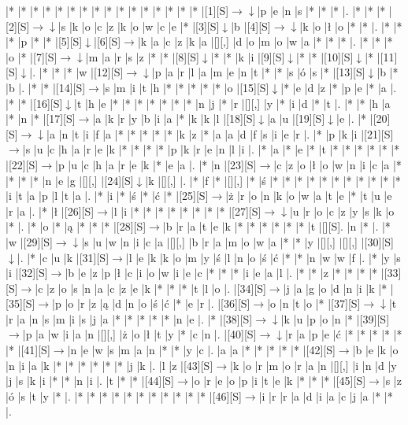 \documentclass[11pt]{article}
\newcommand\drarr{$\rightarrow \!\!\!\!\! \downarrow$}
\newcommand\rarr{$\rightarrow$}
\newcommand\darr{$\downarrow$}
\begin{document}
\noindent\begin{Puzzle}{23}{27}|*	|*	|*	|*	|*	|*	|*	|*	|*	|*	|*	|*	|*	|*	|*	|*	|[1][S]\drarr	|p	|e	|n	|s	|*	|*	|*	|.
|*	|*	|*	|[2][S]\drarr	|s	|k	|o	|c	|z	|k	|o	|w	|c	|e	|*	|[3][S]\darr	|b	|[4][S]\drarr	|k	|o	|ł	|o	|*	|*	|.
|*	|*	|*	|p	|*	|*	|[5][S]\darr	|[6][S]\rarr	|k	|a	|c	|z	|k	|a	|[][,]{ }	|d	|o	|m	|o	|w	|a	|*	|*	|*	|.
|*	|*	|*	|o	|*	|[7][S]\drarr	|m	|a	|r	|s	|z	|*	|*	|[8][S]\darr	|*	|*	|k	|i	|[9][S]\darr	|*	|*	|[10][S]\darr	|*	|[11][S]\darr	|.
|*	|*	|*	|w	|[12][S]\drarr	|p	|a	|r	|l	|a	|m	|e	|n	|t	|*	|*	|s	|ó	|s	|*	|[13][S]\darr	|b	|*	|b	|.
|*	|*	|[14][S]\rarr	|s	|m	|i	|t	|h	|*	|*	|*	|*	|*	|o	|[15][S]\darr	|*	|e	|d	|z	|*	|p	|e	|*	|a	|.
|*	|*	|[16][S]\darr	|t	|h	|e	|*	|*	|*	|*	|*	|*	|*	|n	|j	|*	|r	|[][,]{ }	|y	|*	|i	|d	|*	|t	|.
|*	|*	|h	|a	|*	|n	|*	|[17][S]\rarr	|a	|k	|r	|y	|b	|i	|a	|*	|k	|k	|l	|[18][S]\darr	|a	|u	|[19][S]\darr	|e	|.
|*	|[20][S]\drarr	|a	|n	|t	|i	|f	|a	|*	|*	|*	|*	|*	|k	|z	|*	|a	|a	|d	|f	|s	|i	|e	|r	|.
|*	|p	|k	|i	|[21][S]\rarr	|s	|u	|c	|h	|a	|r	|e	|k	|*	|*	|*	|*	|p	|k	|r	|e	|n	|l	|i	|.
|*	|a	|*	|e	|*	|t	|*	|*	|*	|*	|*	|*	|[22][S]\rarr	|p	|u	|c	|h	|a	|r	|e	|k	|*	|e	|a	|.
|*	|n	|[23][S]\rarr	|c	|z	|o	|ł	|o	|w	|n	|i	|c	|a	|*	|*	|*	|*	|n	|e	|g	|[][,]{ }	|[24][S]\darr	|k	|[][,]{ }	|.
|*	|f	|*	|[][,]{ }	|*	|ś	|*	|*	|*	|*	|*	|*	|*	|*	|*	|*	|*	|i	|t	|a	|p	|l	|t	|a	|.
|*	|i	|*	|ś	|*	|ć	|*	|[25][S]\rarr	|ż	|r	|o	|n	|k	|o	|w	|a	|t	|e	|*	|t	|u	|e	|r	|a	|.
|*	|ł	|[26][S]\rarr	|l	|i	|*	|*	|*	|*	|*	|*	|*	|*	|[27][S]\drarr	|u	|r	|o	|c	|z	|y	|s	|k	|o	|*	|.
|*	|o	|*	|ą	|*	|*	|*	|[28][S]\rarr	|b	|r	|a	|t	|e	|k	|*	|*	|*	|*	|*	|*	|t	|[][S].	|n	|*	|.
|*	|w	|[29][S]\drarr	|s	|u	|w	|n	|i	|c	|a	|[][,]{ }	|b	|r	|a	|m	|o	|w	|a	|*	|*	|y	|[][,]{ }	|[][,]{ }	|[30][S]\darr	|.
|*	|c	|u	|k	|[31][S]\rarr	|l	|e	|k	|k	|o	|m	|y	|ś	|l	|n	|o	|ś	|ć	|*	|*	|n	|w	|w	|f	|.
|*	|y	|s	|i	|[32][S]\rarr	|b	|e	|z	|p	|ł	|c	|i	|o	|w	|i	|e	|c	|*	|*	|*	|i	|e	|a	|l	|.
|*	|*	|z	|*	|*	|*	|*	|[33][S]\rarr	|c	|z	|o	|s	|n	|a	|c	|z	|e	|k	|*	|*	|*	|t	|l	|o	|.
|[34][S]\rarr	|j	|a	|g	|o	|d	|n	|i	|k	|*	|[35][S]\rarr	|p	|o	|r	|z	|ą	|d	|n	|o	|ś	|ć	|*	|e	|r	|.
|[36][S]\rarr	|o	|n	|t	|o	|*	|[37][S]\drarr	|t	|r	|a	|n	|s	|m	|i	|s	|j	|a	|*	|*	|*	|*	|*	|n	|e	|.
|*	|[38][S]\drarr	|k	|u	|p	|o	|n	|*	|[39][S]\rarr	|p	|a	|w	|i	|a	|n	|[][,]{ }	|ż	|o	|ł	|t	|y	|*	|c	|n	|.
|[40][S]\drarr	|r	|a	|p	|e	|ć	|*	|*	|*	|*	|*	|*	|[41][S]\rarr	|n	|e	|w	|s	|m	|a	|n	|*	|*	|y	|c	|.
|a	|a	|*	|*	|*	|*	|*	|[42][S]\rarr	|b	|e	|k	|o	|n	|i	|a	|k	|*	|*	|*	|*	|*	|*	|j	|k	|.
|l	|z	|[43][S]\rarr	|k	|o	|r	|m	|o	|r	|a	|n	|[][,]{ }	|i	|n	|d	|y	|j	|s	|k	|i	|*	|*	|n	|i	|.
|t	|*	|*	|[44][S]\rarr	|o	|r	|e	|o	|p	|i	|t	|e	|k	|*	|*	|*	|[45][S]\rarr	|s	|z	|ó	|s	|t	|y	|*	|.
|*	|*	|*	|*	|*	|*	|*	|*	|*	|*	|*	|[46][S]\rarr	|i	|r	|r	|a	|d	|i	|a	|c	|j	|a	|*	|*	|.\end{Puzzle}
\end{document}
